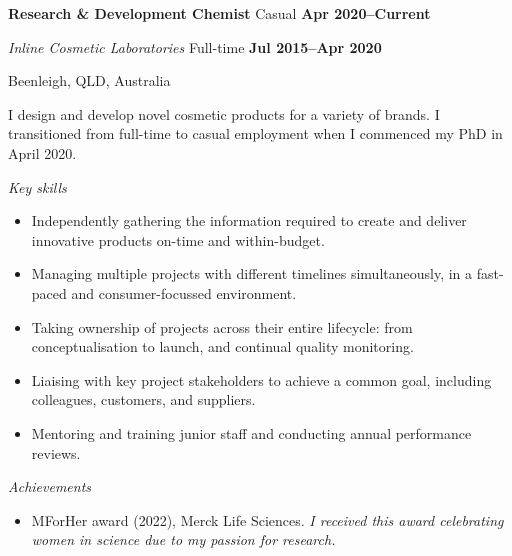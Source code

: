 
\textbf{\large Research \& Development Chemist} \hfill Casual \textbf{Apr 2020--Current}\par
\vspace{1mm}
\textit{Inline Cosmetic Laboratories} \hfill Full-time \textbf{Jul 2015--Apr 2020}\par
\vspace{1mm}
\hfill Beenleigh, QLD, Australia \par
\vspace{1mm}
I design and develop novel cosmetic products for a variety of brands. I transitioned from full-time to casual employment when I commenced my PhD in April 2020.\par
\vspace{2mm}
\textit{Key skills} \par
\begin{itemize}
	\item Independently gathering the information required to create and deliver innovative products on-time and within-budget.
	\item Managing multiple projects with different timelines simultaneously, in a fast-paced and consumer-focussed environment.
	\item Taking ownership of projects across their entire lifecycle: from conceptualisation to launch, and continual quality monitoring.
	\item Liaising with key project stakeholders to achieve a common goal, including colleagues, customers, and suppliers.
    \item Mentoring and training junior staff and conducting annual performance reviews.
\end{itemize}\par
\vspace{2mm}
\textit{Achievements} \par
\begin{itemize}
	\item MForHer award (2022), Merck Life Sciences. \textit{I received this award celebrating women in science due to my passion for research.}
\end{itemize}\par